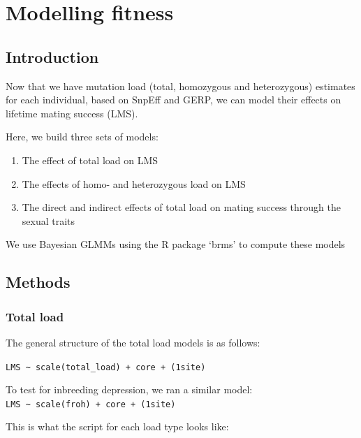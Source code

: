 \documentclass[
  letterpaper,
  DIV=11,
  numbers=noendperiod]{scrreprt}
\providecommand{\tightlist}{%
  \setlength{\itemsep}{0pt}\setlength{\parskip}{0pt}}\usepackage{longtable,booktabs,array}
\begin{document}

\chapter{Modelling fitness}\label{modelling-fitness}

\section{Introduction}\label{introduction-4}

Now that we have mutation load (total, homozygous and heterozygous)
estimates for each individual, based on SnpEff and GERP, we can model
their effects on lifetime mating success (LMS).

Here, we build three sets of models:

\begin{enumerate}
\def\labelenumi{\arabic{enumi}.}
\tightlist
\item
  The effect of total load on LMS
\item
  The effects of homo- and heterozygous load on LMS
\item
  The direct and indirect effects of total load on mating success
  through the sexual traits
\end{enumerate}

We use Bayesian GLMMs using the R package `brms' to compute these models

\section{Methods}\label{methods-2}

\subsection{Total load}\label{total-load}

The general structure of the total load models is as follows:

\texttt{LMS\ \textasciitilde{}\ scale(total\_load)\ +\ core\ +\ (1\textbar{}site)}

To test for inbreeding depression, we ran a similar model:
\texttt{LMS\ \textasciitilde{}\ scale(froh)\ +\ core\ +\ (1\textbar{}site)}

This is what the script for each load type looks like:
\end{document}
